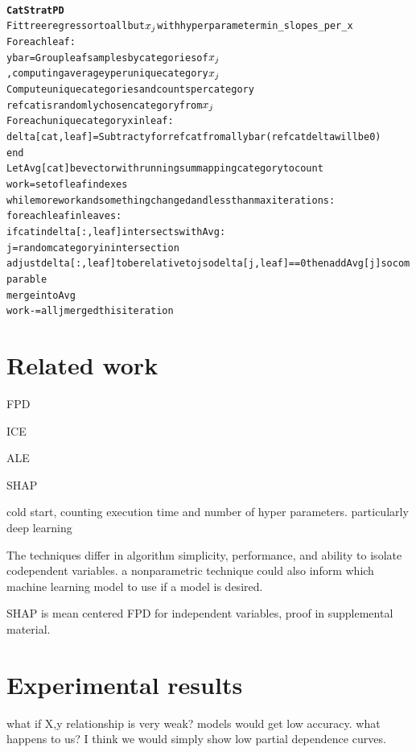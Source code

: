 \documentclass{article}
\begin{document}
\begin{alltt}
{\selectfont\small
{\bf{}CatStratPD}
Fit tree regressor to all but \(x\sb{j}\) with hyper parameter min_slopes_per_x
For each leaf:
    y bar = Group leaf samples by categories of \(x\sb{j}\), computing average y per unique category \(x\sb{j}\)
    Compute unique categories and counts per category
    refcat is randomly chosen category from \(x\sb{j}\)
    For each unique category x in leaf:
        delta[cat,leaf] = Subtract y for refcat from all y bar (refcat delta will be 0)
end
Let Avg[cat] be vector with running sum mapping category to count
work = set of leaf indexes
while more work and something changed and less than max iterations:
    for each leaf in leaves:
        if cat in delta[:,leaf] intersects with Avg:
            j = random category in intersection
            adjust delta[:,leaf] to be relative to j so delta[j,leaf]==0 then add Avg[j] so comparable
            merge into Avg
    work -= all j merged this iteration
}
\end{alltt}


\section{Related work}\label{sec:related}

FPD

ICE

ALE

SHAP

cold start, counting execution time and number of hyper parameters. particularly deep learning

The techniques differ in algorithm simplicity, performance, and ability to isolate codependent variables. a nonparametric technique could also inform which machine learning model to use if a model is desired.

SHAP is mean centered FPD for independent variables, proof in supplemental material.

\section{Experimental results}\label{sec:experiments}

what if X,y relationship is very weak? models would get low accuracy. what happens to us?  I think we would simply show low partial dependence curves.
\end{document}
